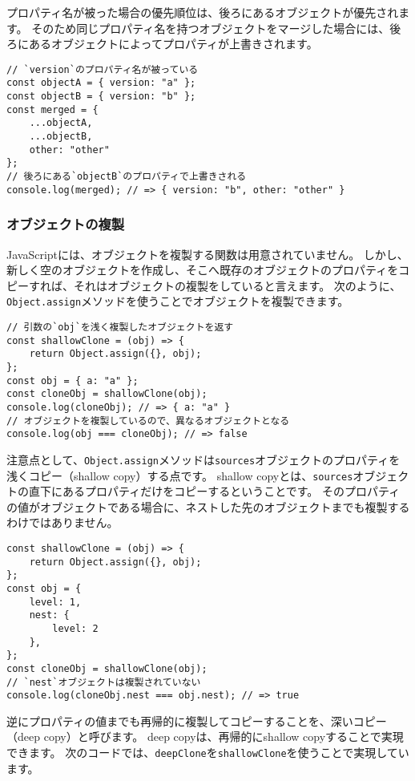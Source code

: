 プロパティ名が被った場合の優先順位は、後ろにあるオブジェクトが優先されます。
そのため同じプロパティ名を持つオブジェクトをマージした場合には、後ろにあるオブジェクトによってプロパティが上書きされます。

\begin{lstlisting}
// `version`のプロパティ名が被っている
const objectA = { version: "a" };
const objectB = { version: "b" };
const merged = { 
    ...objectA,
    ...objectB,
    other: "other"
};
// 後ろにある`objectB`のプロパティで上書きされる
console.log(merged); // => { version: "b", other: "other" }
\end{lstlisting}

\hypertarget{copy}{%
\subsubsection{オブジェクトの複製}\label{copy}}

JavaScriptには、オブジェクトを複製する関数は用意されていません。
しかし、新しく空のオブジェクトを作成し、そこへ既存のオブジェクトのプロパティをコピーすれば、それはオブジェクトの複製をしていると言えます。
次のように、\texttt{Object.assign}メソッドを使うことでオブジェクトを複製できます。

\begin{lstlisting}
// 引数の`obj`を浅く複製したオブジェクトを返す
const shallowClone = (obj) => {
    return Object.assign({}, obj);
};
const obj = { a: "a" };
const cloneObj = shallowClone(obj);
console.log(cloneObj); // => { a: "a" }
// オブジェクトを複製しているので、異なるオブジェクトとなる
console.log(obj === cloneObj); // => false
\end{lstlisting}

注意点として、\texttt{Object.assign}メソッドは\texttt{sources}オブジェクトのプロパティを浅くコピー（shallow
copy）する点です。 shallow
copyとは、\texttt{sources}オブジェクトの直下にあるプロパティだけをコピーするということです。
そのプロパティの値がオブジェクトである場合に、ネストした先のオブジェクトまでも複製するわけではありません。

\begin{lstlisting}
const shallowClone = (obj) => {
    return Object.assign({}, obj);
};
const obj = { 
    level: 1,
    nest: {
        level: 2
    },
};
const cloneObj = shallowClone(obj);
// `nest`オブジェクトは複製されていない
console.log(cloneObj.nest === obj.nest); // => true
\end{lstlisting}

逆にプロパティの値までも再帰的に複製してコピーすることを、深いコピー（deep
copy）と呼びます。 deep copyは、再帰的にshallow
copyすることで実現できます。
次のコードでは、\texttt{deepClone}を\texttt{shallowClone}を使うことで実現しています。

